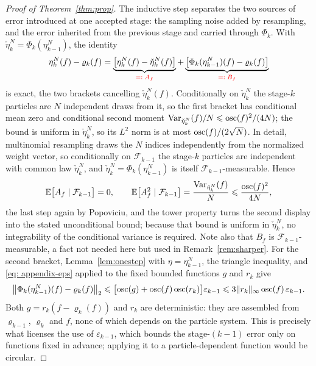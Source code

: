 \documentclass{article}
\begin{document}
\begin{proof}[Proof of Theorem~\ref{thm:prop}]
The inductive step separates the two sources of error introduced at one accepted stage: the sampling noise added by resampling, and the error inherited from the previous stage and carried through $\Phi_k$. With $\check\eta_k^N=\Phi_k(\eta_{k-1}^N)$, the identity
\begin{equation*}
    \eta_k^N(f)-\varrho_k(f)
    = \underbrace{\bigl[\eta_k^N(f)-\check\eta_k^N(f)\bigr]}_{\text{\color{red}$=:A_f$}}
    + \underbrace{\bigl[\Phi_k(\eta_{k-1}^N)(f)-\varrho_k(f)\bigr]}_{\text{\color{red}$=:B_f$}}
\end{equation*}
is exact, the two brackets cancelling $\check\eta_k^N(f)$. Conditionally on $\check\eta_k^N$ the stage-$k$ particles are $N$ independent draws from it, so the first bracket has conditional mean zero and conditional second moment $\operatorname{Var}_{\check\eta_k^N}(f)/N\leqslant\operatorname{osc}(f)^2/(4N)$; the bound is uniform in $\check\eta_k^N$, so its $L^2$ norm is at most $\operatorname{osc}(f)/(2\sqrt N)$. {\color{red}In detail, multinomial resampling draws the $N$ indices independently from the normalized weight vector, so conditionally on $\mathcal F_{k-1}$ the stage-$k$ particles are independent with common law $\check\eta_k^N$, and $\check\eta_k^N=\Phi_k(\eta_{k-1}^N)$ is itself $\mathcal F_{k-1}$-measurable. Hence
\begin{equation*}
    \mathbb E\bigl[A_f \mid \mathcal F_{k-1}\bigr]=0,
    \qquad
    \mathbb E\bigl[A_f^2 \mid \mathcal F_{k-1}\bigr]=\frac{\operatorname{Var}_{\check\eta_k^N}(f)}{N}\leqslant\frac{\operatorname{osc}(f)^2}{4N},
\end{equation*}
the last step again by Popoviciu, and the tower property turns the second display into the stated unconditional bound; because that bound is uniform in $\check\eta_k^N$, no integrability of the conditional variance is required. Note also that $B_f$ is $\mathcal F_{k-1}$-measurable, a fact not needed here but used in Remark~\ref{rem:sharper}.}
For the second bracket, Lemma~\ref{lem:onestep} with $\eta=\eta_{k-1}^N$, the triangle inequality, and \eqref{eq: appendix-eps} applied to the fixed bounded functions $g$ and $r_k$ give
\begin{equation*}
    \bigl\lVert\Phi_k(\eta_{k-1}^N)(f)-\varrho_k(f)\bigr\rVert_2
    \leqslant \bigl[\operatorname{osc}(g)+\operatorname{osc}(f)\operatorname{osc}(r_k)\bigr]\varepsilon_{k-1}
    \leqslant 3\lVert r_k\rVert_\infty\operatorname{osc}(f)\,\varepsilon_{k-1}.
\end{equation*}
{\color{red}Both $g=r_k(f-\varrho_k(f))$ and $r_k$ are deterministic: they are assembled from $\varrho_{k-1}$, $\varrho_k$ and $f$, none of which depends on the particle system. This is precisely what licenses the use of $\varepsilon_{k-1}$, which bounds the stage-$(k-1)$ error only on functions fixed in advance; applying it to a particle-dependent function would be circular.}

\end{proof}
\end{document}
